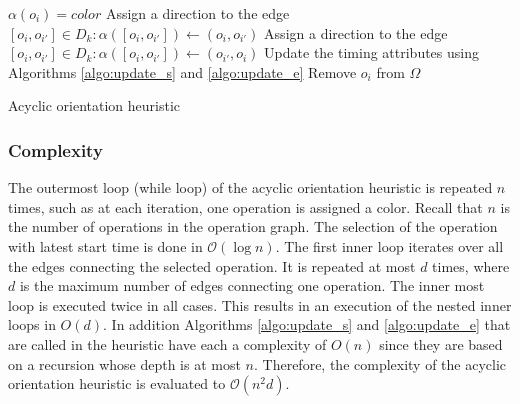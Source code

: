 \begin{algorithm}[htb]
{{{								%
			}
			$\alpha(o_i)=color$\;
			{
				{
					Assign a direction to the edge $[o_i,o_{i'}] \in D_k: \alpha([o_i,o_{i'}])\leftarrow (o_i,o_{i'})$
				}
				\Else
				{
					Assign a direction to the edge $[o_i,o_{i'}] \in D_k: \alpha([o_i,o_{i'}])\leftarrow (o_{i'},o_i)$
				}
			}
			Update the timing attributes using Algorithms \ref{algo:update_s} and \ref{algo:update_e}\;
			Remove $o_i$ from $\Omega$\;
		}
	}
	
 
	\caption{Acyclic orientation heuristic}
	\label{algo:ao}
\end{algorithm}

\subsubsection{Complexity}

The outermost loop (while loop) of the acyclic orientation heuristic is repeated $n$ times, such as at each iteration, one operation is assigned a color. Recall that $n$ is the number of operations in the operation graph. The selection of the operation with latest start time is done in $\mathcal{O}(\log{}n)$. The first inner loop iterates over all the edges connecting the selected operation. It is repeated at most $d$ times, where $d$ is the maximum number of edges connecting one operation. The inner most loop is executed twice in all cases. This results in an execution of the nested inner loops in $O(d)$. In addition Algorithms \ref{algo:update_s} and \ref{algo:update_e} that are called in the heuristic have each a complexity of $O(n)$ since they are based on a recursion whose depth is at most $n$. Therefore, the complexity of the acyclic orientation heuristic is evaluated to $\mathcal{O}(n^2d)$.  


%
%

